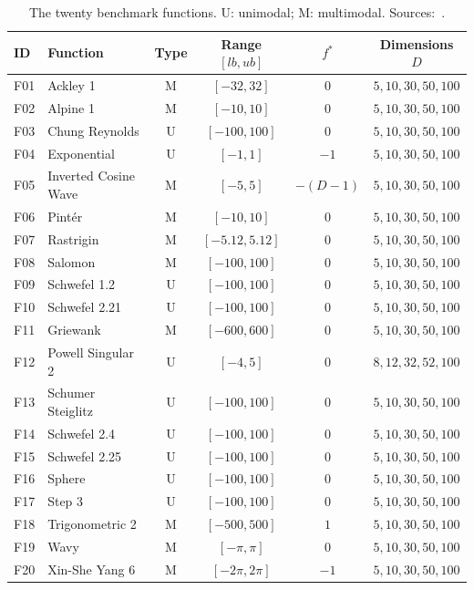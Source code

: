 \begin{table}[htbp]
\centering\small
\caption{The twenty benchmark functions. U: unimodal; M: multimodal. Sources:~\citep{Ackley1987,Rastrigin1974,Salomon1996,Pinter1996,Schwefel1981}.}
\label{tab:functions}
\begin{tabular}{llcccc}
\toprule
ID & Function & Type & Range $[lb,ub]$ & $f^*$ & Dimensions $D$ \\
\midrule
F01 & Ackley 1 & M & $[-32,32]$ & $0$ & $5,10,30,50,100$ \\
F02 & Alpine 1 & M & $[-10,10]$ & $0$ & $5,10,30,50,100$ \\
F03 & Chung Reynolds & U & $[-100,100]$ & $0$ & $5,10,30,50,100$ \\
F04 & Exponential & U & $[-1,1]$ & $-1$ & $5,10,30,50,100$ \\
F05 & Inverted Cosine Wave & M & $[-5,5]$ & $-(D{-}1)$ & $5,10,30,50,100$ \\
F06 & Pint\'er & M & $[-10,10]$ & $0$ & $5,10,30,50,100$ \\
F07 & Rastrigin & M & $[-5.12,5.12]$ & $0$ & $5,10,30,50,100$ \\
F08 & Salomon & M & $[-100,100]$ & $0$ & $5,10,30,50,100$ \\
F09 & Schwefel 1.2 & U & $[-100,100]$ & $0$ & $5,10,30,50,100$ \\
F10 & Schwefel 2.21 & U & $[-100,100]$ & $0$ & $5,10,30,50,100$ \\
F11 & Griewank & M & $[-600,600]$ & $0$ & $5,10,30,50,100$ \\
F12 & Powell Singular 2 & U & $[-4,5]$ & $0$ & $8,12,32,52,100$ \\
F13 & Schumer Steiglitz & U & $[-100,100]$ & $0$ & $5,10,30,50,100$ \\
F14 & Schwefel 2.4 & U & $[-100,100]$ & $0$ & $5,10,30,50,100$ \\
F15 & Schwefel 2.25 & U & $[-100,100]$ & $0$ & $5,10,30,50,100$ \\
F16 & Sphere & U & $[-100,100]$ & $0$ & $5,10,30,50,100$ \\
F17 & Step 3 & U & $[-100,100]$ & $0$ & $5,10,30,50,100$ \\
F18 & Trigonometric 2 & M & $[-500,500]$ & $1$ & $5,10,30,50,100$ \\
F19 & Wavy & M & $[-\pi,\pi]$ & $0$ & $5,10,30,50,100$ \\
F20 & Xin-She Yang 6 & M & $[-2\pi,2\pi]$ & $-1$ & $5,10,30,50,100$ \\
\bottomrule
\end{tabular}
\end{table}
